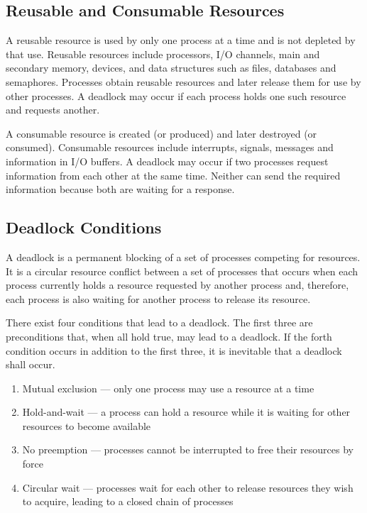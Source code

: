 \subsection{Reusable and Consumable Resources}

A reusable resource is used by only one process at a time and is not depleted by that use.
Reusable resources include processors, I/O channels, main and secondary memory, devices, and data structures such as files, databases and semaphores.
Processes obtain reusable resources and later release them for use by other processes.
A deadlock may occur if each process holds one such resource and requests another.

A consumable resource is created (or produced) and later destroyed (or consumed).
Consumable resources include interrupts, signals, messages and information in I/O buffers.
A deadlock may occur if two processes request information from each other at the same time.
Neither can send the required information because both are waiting for a response.

\subsection{Deadlock Conditions}

A deadlock is a permanent blocking of a set of processes competing for resources.
It is a circular resource conflict between a set of processes that occurs when each process currently holds a resource requested by another process and, therefore, each process is also waiting for another process to release its resource.

There exist four conditions that lead to a deadlock.
The first three are preconditions that, when all hold true, may lead to a deadlock.
If the forth condition occurs in addition to the first three, it is inevitable that a deadlock shall occur.

\begin{enumerate}
  \item Mutual exclusion --- only one process may use a resource at a time
  \item Hold-and-wait --- a process can hold a resource while it is waiting for other resources to become available
  \item No preemption --- processes cannot be interrupted to free their resources by force
  \item Circular wait --- processes wait for each other to release resources they wish to acquire, leading to a closed chain of processes
\end{enumerate}

